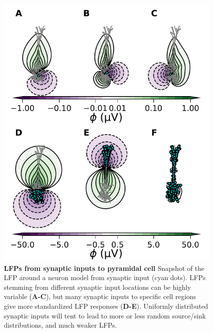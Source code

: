 \begin{figure}[!ht]
\begin{center}
\includegraphics[width=.6\textwidth]{Figures/LFP/fig_chosen_dipoles.pdf}
\end{center}
\caption{\textbf{LFPs from synaptic inputs to pyramidal cell}
Snapshot of the LFP around a neuron model from synaptic input (cyan dots). LFPs stemming from different synaptic input locations can be highly variable ({\bf A-C}), but many synaptic inputs to specific cell regions give more standardized LFP responses ({\bf D-E}). Uniformly distributed synaptic inputs will tent to lead to more or less random source/sink distributions, and much weaker LFPs.
}
\label{fig:LFP:LFP_dipoles}
\end{figure}


